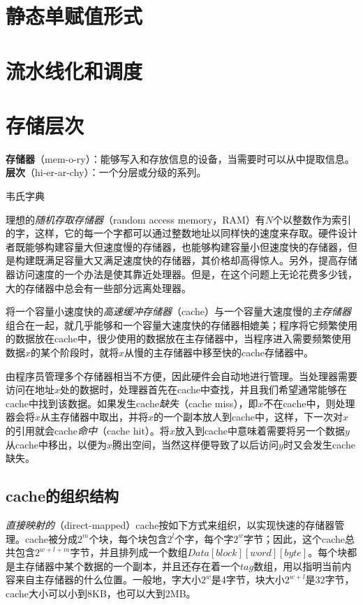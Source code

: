 \documentclass[cn,11pt,chinese]{elegantbook}
\begin{document}
\chapter{静态单赋值形式}

\chapter{流水线化和调度}

\chapter{存储层次}

\epigraph{\textbf{存储器}（mem-o-ry）：能够写入和存放信息的设备，当需要时可以从中提取信息。\\\textbf{层次}（hi-er-ar-chy）：一个分层或分级的系列。}{韦氏字典}

理想的\textit{随机存取存储器}（random access memory，RAM）有$N$个以整数作为索引的字，这样，它的每一个字都可以通过整数地址以同样快的速度来存取。硬件设计者既能够构建容量大但速度慢的存储器，也能够构建容量小但速度快的存储器，但是构建既满足容量大又满足速度快的存储器，其价格却高得惊人。另外，提高存储器访问速度的一个办法是使其靠近处理器。但是，在这个问题上无论花费多少钱，大的存储器中总会有一些部分远离处理器。

将一个容量小速度快的\textit{高速缓冲存储器}（cache）与一个容量大速度慢的\textit{主存储器}组合在一起，就几乎能够和一个容量大速度快的存储器相媲美；程序将它频繁使用的数据放在cache中，很少使用的数据放在主存储器中，当程序进入需要频繁使用数据$x$的某个阶段时，就将$x$从慢的主存储器中移至快的cache存储器中。

由程序员管理多个存储器相当不方便，因此硬件会自动地进行管理。当处理器需要访问在地址$x$处的数据时，处理器首先在cache中查找，并且我们希望通常能够在cache中找到该数据。如果发生cache\textit{缺失}（cache miss），即$x$不在cache中，则处理器会将$x$从主存储器中取出，并将$x$的一个副本放人到cache中，这样，下一次对$x$的引用就会cache\textit{命中}（cache hit）。将$x$放入到cache中意味着需要将另一个数据$y$从cache中移出，以便为$x$腾出空间，当然这样便导致了以后访问$y$时又会发生cache缺失。

\section{cache的组织结构}

\textit{直接映射的}（direct-mapped）cache按如下方式来组织，以实现快速的存储器管理。cache被分成$2^m$个块，每个块包含$2^l$个字，每个字$2^w$字节；因此，这个cache总共包含$2^{w+l+m}$字节，并且排列成一个数组$Data[block][word][byte]$。每个块都是主存储器中某个数据的一个副本，并且还存在着一个$tag$数组，用以指明当前内容来自主存储器的什么位置。一般地，字大小$2^w$是4字节，块大小$2^{w+l}$是32字节，cache大小可以小到8KB，也可以大到2MB。
\end{document}
